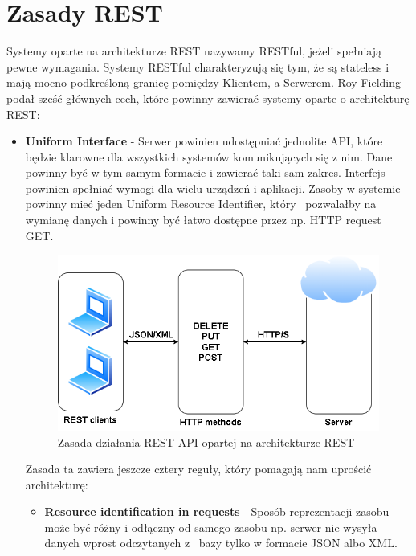 \documentclass[oneside,polski,logo,indent]{amuthesis}
\begin{document}
\section{Zasady REST}

Systemy oparte na architekturze REST nazywamy RESTful, jeżeli spełniają pewne wymagania. Systemy RESTful charakteryzują się tym, że są stateless i mają mocno podkreśloną granicę pomiędzy Klientem, a Serwerem. Roy Fielding podał sześć głównych cech, które powinny zawierać systemy oparte o architekturę REST:\newline 

\begin{itemize}
\item \textbf{Uniform Interface} - Serwer powinien udostępniać jednolite API, które będzie klarowne dla wszystkich systemów komunikujących się z nim. Dane powinny być w tym samym formacie i zawierać taki sam zakres. Interfejs powinien spełniać wymogi dla wielu urządzeń i aplikacji. Zasoby w systemie powinny mieć jeden Uniform Resource Identifier, który~ pozwalałby na wymianę danych i powinny być łatwo dostępne przez np. HTTP request GET.

\begin{figure}[H]
\centering
\includegraphics[width=14cm]{restarch.png}
\caption{Zasada działania REST API opartej na architekturze REST}
\label{REST API}
\end{figure}

Zasada ta zawiera jeszcze cztery reguły, który pomagają nam uprościć architekturę: 
\begin{itemize}
\item \textbf{Resource identification in requests} - Sposób reprezentacji zasobu może być różny i odłączny od samego zasobu np. serwer nie wysyła danych wprost odczytanych z~ bazy tylko w formacie JSON albo XML.\newline 


\end{itemize}
\end{itemize}
\end{document}
